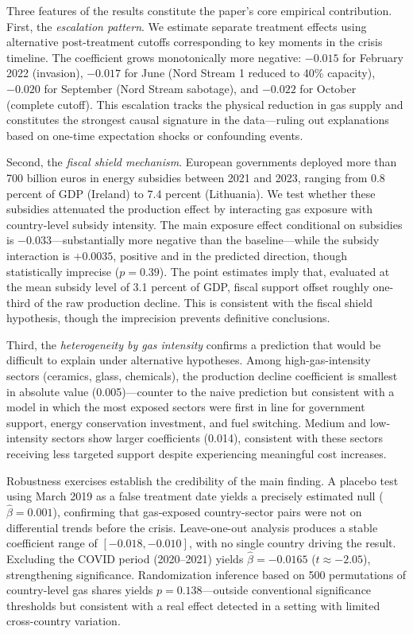 \documentclass[12pt]{article}
\begin{document}
Three features of the results constitute the paper's core empirical contribution. First, the \textit{escalation pattern}. We estimate separate treatment effects using alternative post-treatment cutoffs corresponding to key moments in the crisis timeline. The coefficient grows monotonically more negative: $-0.015$ for February 2022 (invasion), $-0.017$ for June (Nord Stream 1 reduced to 40\% capacity), $-0.020$ for September (Nord Stream sabotage), and $-0.022$ for October (complete cutoff). This escalation tracks the physical reduction in gas supply and constitutes the strongest causal signature in the data---ruling out explanations based on one-time expectation shocks or confounding events.

Second, the \textit{fiscal shield mechanism}. European governments deployed more than 700 billion euros in energy subsidies between 2021 and 2023, ranging from 0.8 percent of GDP (Ireland) to 7.4 percent (Lithuania). We test whether these subsidies attenuated the production effect by interacting gas exposure with country-level subsidy intensity. The main exposure effect conditional on subsidies is $-0.033$---substantially more negative than the baseline---while the subsidy interaction is $+0.0035$, positive and in the predicted direction, though statistically imprecise ($p = 0.39$). The point estimates imply that, evaluated at the mean subsidy level of 3.1 percent of GDP, fiscal support offset roughly one-third of the raw production decline. This is consistent with the fiscal shield hypothesis, though the imprecision prevents definitive conclusions.

Third, the \textit{heterogeneity by gas intensity} confirms a prediction that would be difficult to explain under alternative hypotheses. Among high-gas-intensity sectors (ceramics, glass, chemicals), the production decline coefficient is smallest in absolute value (0.005)---counter to the naive prediction but consistent with a model in which the most exposed sectors were first in line for government support, energy conservation investment, and fuel switching. Medium and low-intensity sectors show larger coefficients (0.014), consistent with these sectors receiving less targeted support despite experiencing meaningful cost increases.

Robustness exercises establish the credibility of the main finding. A placebo test using March 2019 as a false treatment date yields a precisely estimated null ($\hat{\beta} = 0.001$), confirming that gas-exposed country-sector pairs were not on differential trends before the crisis. Leave-one-out analysis produces a stable coefficient range of $[-0.018, -0.010]$, with no single country driving the result. Excluding the COVID period (2020--2021) yields $\hat{\beta} = -0.0165$ ($t \approx -2.05$), strengthening significance. Randomization inference based on 500 permutations of country-level gas shares yields $p = 0.138$---outside conventional significance thresholds but consistent with a real effect detected in a setting with limited cross-country variation.
\end{document}

